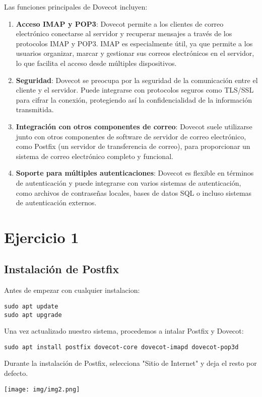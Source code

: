 \documentclass{article}
\begin{document}
Las funciones principales de Dovecot incluyen:\\
\begin{enumerate}
\item \textbf{Acceso IMAP y POP3}: Dovecot permite a los clientes de correo electrónico conectarse al servidor y recuperar mensajes a través de los protocolos IMAP y POP3. IMAP es especialmente útil, ya que permite a los usuarios organizar, marcar y gestionar sus correos electrónicos en el servidor, lo que facilita el acceso desde múltiples dispositivos.
\item \textbf{Seguridad}: Dovecot se preocupa por la seguridad de la comunicación entre el cliente y el servidor. Puede integrarse con protocolos seguros como TLS/SSL para cifrar la conexión, protegiendo así la confidencialidad de la información transmitida.
\item \textbf{Integración con otros componentes de correo}: Dovecot suele utilizarse junto con otros componentes de software de servidor de correo electrónico, como Postfix (un servidor de transferencia de correo), para proporcionar un sistema de correo electrónico completo y funcional.
\item \textbf{Soporte para múltiples autenticaciones}: Dovecot es flexible en términos de autenticación y puede integrarse con varios sistemas de autenticación, como archivos de contraseñas locales, bases de datos SQL o incluso sistemas de autenticación externos.
\end{enumerate}


\section{Ejercicio 1}
\subsection{Instalación de Postfix}
Antes de empezar con cualquier instalacion:

\lstset{language=Bash, breaklines=true, basicstyle=\footnotesize}
\begin{lstlisting}[frame=single]
sudo apt update
sudo apt upgrade
\end{lstlisting}

Una vez actualizado nuestro sistema, procedemos a intalar Postfix y Dovecot:
\lstset{language=Bash, breaklines=true, basicstyle=\footnotesize}
\begin{lstlisting}[frame=single]
sudo apt install postfix dovecot-core dovecot-imapd dovecot-pop3d
\end{lstlisting}
Durante la instalación de Postfix, selecciona "Sitio de Internet" y deja el resto por defecto.
\begin{center}
\texttt{[image: img/img2.png]} 
\end{center}
\end{document}
